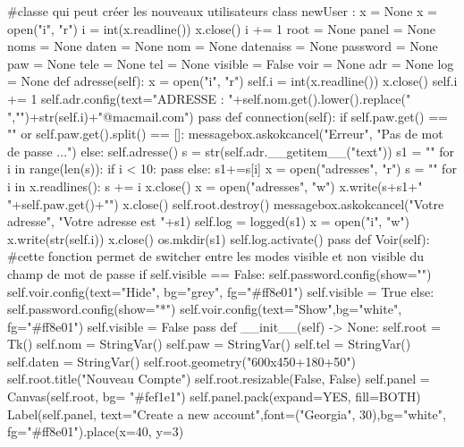 \begin{Pythoncode}[numbers=left, caption={Python Code}]
#classe qui peut créer les nouveaux utilisateurs
class newUser :
    x = None
    x = open("i", "r")
    i = int(x.readline())
    x.close()
    i += 1
    root = None
    panel = None
    noms = None
    daten = None
    nom = None
    datenaiss = None
    password = None
    paw = None
    tele =  None
    tel = None
    visible = False
    voir = None
    adr = None
    log = None
    def adresse(self):
        x = open("i", "r")
        self.i = int(x.readline())
        x.close()
        self.i += 1
        self.adr.config(text="ADRESSE : "+self.nom.get().lower().replace(" ","")+str(self.i)+"@macmail.com")
        pass
    def connection(self):
        if self.paw.get() == "" or self.paw.get().split() == []:
            messagebox.askokcancel("Erreur", "Pas de mot de passe ...")
        else:
            self.adresse()
            s = str(self.adr.__getitem__("text"))
            s1 = ""
            for i in range(len(s)):
                if i < 10:
                    pass
                else:
                    s1+=s[i]
            x = open("adresses", "r")
            s = ""
            for i in x.readlines():
                s += i
            x.close()
            x = open("adresses", "w")
            x.write(s+s1+" "+self.paw.get()+"\n")
            x.close()
            self.root.destroy()
            messagebox.askokcancel("Votre adresse", "Votre adresse est "+s1)
            self.log = logged(s1)
            x = open("i", "w")
            x.write(str(self.i))
            x.close()
            os.mkdir(s1)
            self.log.activate()
        pass
    def Voir(self):
        #cette fonction permet de switcher entre les modes visible et non visible du champ de mot de passe
        if self.visible == False:
            self.password.config(show="")
            self.voir.config(text="Hide", bg="grey", fg="#ff8e01")
            self.visible = True
        else:
            self.password.config(show="*")
            self.voir.config(text="Show",bg="white", fg="#ff8e01")
            self.visible = False
        pass
    def __init__(self) -> None:
        self.root = Tk()
        self.nom = StringVar()
        self.paw = StringVar()
        self.tel = StringVar()
        self.daten = StringVar()
        self.root.geometry("600x450+180+50")
        self.root.title("Nouveau Compte")
        self.root.resizable(False, False)
        self.panel = Canvas(self.root, bg= "#fef1e1")
        self.panel.pack(expand=YES, fill=BOTH) 
        Label(self.panel, text="Create a new account",font=("Georgia", 30),bg="white", fg="#ff8e01").place(x=40, y=3)

\end{Pythoncode}
